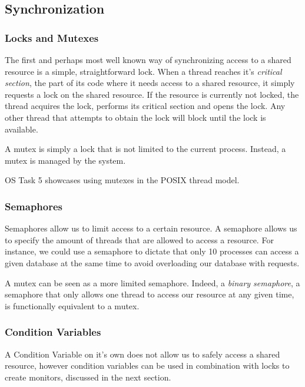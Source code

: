 
\subsection{Synchronization}
\label{sync}
\subsubsection{Locks and Mutexes}

The first and perhaps most well known way of synchronizing access to a shared resource is a simple, straightforward lock.
When a thread reaches it's \textit{critical section}, the part of its code where it needs access to a shared resource, it simply requests a lock on the shared resource. If the resource is currently not locked, the thread acquires the lock, performs its critical section and opens the lock. Any other thread that attempts to obtain the lock will block until the lock is available.

A mutex is simply a lock that is not limited to the current process. Instead, a mutex is managed by the system. 

OS Task 5 \cite{task5} showcases using mutexes in the POSIX thread model.

\subsubsection{Semaphores}

Semaphores allow us to limit access to a certain resource. A semaphore allows us to specify the amount of threads that are allowed to access a resource. For instance, we could use a semaphore to dictate that only 10 processes can access a given database at the same time to avoid overloading our database with requests. 

A mutex can be seen as a more limited semaphore. Indeed, a \textit{binary semaphore}, a semaphore that only allows one thread to access our resource at any given time, is functionally equivalent to a mutex.

\subsubsection{Condition Variables}
A Condition Variable on it's own does not allow us to safely access a shared resource, however condition variables can be used in combination with locks to create monitors, discussed in the next section.

